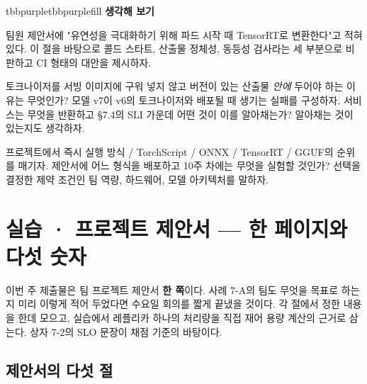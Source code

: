 \begin{calloutbox}{tbbpurple}{tbbpurplefill}
{\normalsize\bfseries\color{tbbpurple}생각해 보기}\par\vspace{3pt}
\begin{tbbitemize}
  \item 팀원 제안서에 "유연성을 극대화하기 위해 파드 시작 때 TensorRT로 변환한다"고 적혀 있다. 이 절을 바탕으로 콜드 스타트, 산출물 정체성, 동등성 검사라는 세 부분으로 비판하고 CI 형태의 대안을 제시하자.
  \item 토크나이저를 서빙 이미지에 구워 넣지 않고 버전이 있는 산출물 \textit{안에} 두어야 하는 이유는 무엇인가? 모델 v7이 v6의 토크나이저와 배포될 때 생기는 실패를 구성하자. 서비스는 무엇을 반환하고 §7.4의 SLI 가운데 어떤 것이 이를 알아채는가? 알아채는 것이 있는지도 생각하자.
  \item 프로젝트에서 즉시 실행 방식 / TorchScript / ONNX / TensorRT / GGUF의 순위를 매기자. 제안서에 어느 형식을 배포하고 10주 차에는 무엇을 실험할 것인가? 선택을 결정한 제약 조건인 팀 역량, 하드웨어, 모델 아키텍처를 말하자.
\end{tbbitemize}
\end{calloutbox}

\section{실습 · 프로젝트 제안서 — 한 페이지와 다섯 숫자}

이번 주 제출물은 팀 프로젝트 제안서 \textbf{한 쪽}이다. 사례 7-A의 팀도 무엇을 목표로 하는지 미리 이렇게 적어 두었다면 수요일 회의를 짧게 끝냈을 것이다. 각 절에서 정한 내용을 한데 모으고, 실습에서 레플리카 하나의 처리량을 직접 재어 용량 계산의 근거로 삼는다. 상자 7-2의 SLO 문장이 채점 기준의 바탕이다.

\subsection*{제안서의 다섯 절}

